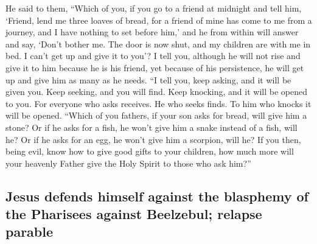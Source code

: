 \begin{paracol}{2}
\begin{otherlanguage}{english}
 He said to them, ``Which of you, if you go to a friend at
midnight and tell him, `Friend, lend me three loaves of bread,
 for a friend of mine has come to me from a journey, and I
have nothing to set before him,'  and he from within will
answer and say, `Don't bother me. The door is now shut, and my children
are with me in bed. I can't get up and give it to you'?  I
tell you, although he will not rise and give it to him because he is his
friend, yet because of his persistence, he will get up and give him as
many as he needs.  ``I tell you, keep asking, and it will
be given you. Keep seeking, and you will find. Keep knocking, and it
will be opened to you.  For everyone who asks receives.
He who seeks finds. To him who knocks it will be opened. 
``Which of you fathers, if your son asks for bread, will give him a
stone? Or if he asks for a fish, he won't give him a snake instead of a
fish, will he?  Or if he asks for an egg, he won't give
him a scorpion, will he?  If you then, being evil, know
how to give good gifts to your children, how much more will your
heavenly Father give the Holy Spirit to those who ask him?''

\hypertarget{jesus-defends-himself-against-the-blasphemy-of-the-pharisees-against-beelzebul-relapse-parable}{%
\subsection{Jesus defends himself against the blasphemy of the Pharisees
against Beelzebul; relapse
parable}\label{jesus-defends-himself-against-the-blasphemy-of-the-pharisees-against-beelzebul-relapse-parable}}


\end{otherlanguage}
\end{paracol}
